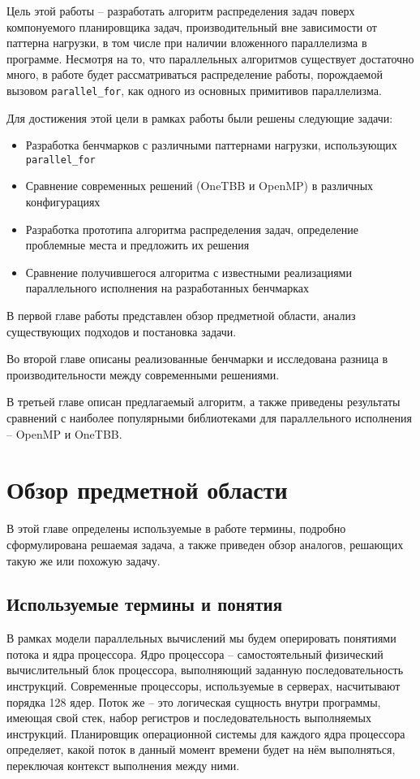 \documentclass[times,specification,annotation]{itmo-student-thesis}
\begin{document}
Цель этой работы -- разработать алгоритм распределения задач поверх компонуемого планировщика задач, производительный вне зависимости от паттерна нагрузки, в том числе при наличии вложенного параллелизма в программе. Несмотря на то, что параллельных алгоритмов существует достаточно много, в работе будет рассматриваться распределение работы, порождаемой вызовом \texttt{parallel\_for}, как одного из основных примитивов параллелизма.

Для достижения этой цели в рамках работы были решены следующие задачи:
\begin{itemize}
  \item Разработка бенчмарков с различными паттернами нагрузки, использующих \texttt{parallel\_for}
  \item Сравнение современных решений (OneTBB и OpenMP) в различных конфигурациях
  \item Разработка прототипа алгоритма распределения задач, определение проблемные места и предложить их решения
  \item Сравнение получившегося алгоритма с известными реализациями параллельного исполнения на разработанных бенчмарках
\end{itemize}

В первой главе работы представлен обзор предметной области, анализ существующих подходов и постановка задачи. 

Во второй главе описаны реализованные бенчмарки и исследована разница в производительности между современными решениями. 

В третьей главе описан предлагаемый алгоритм, а также приведены результаты сравнений с наиболее популярными библиотеками для параллельного исполнения -- OpenMP и OneTBB.  

\chapter{Обзор предметной области}
В этой главе определены используемые в работе термины, подробно сформулирована решаемая задача, а также приведен обзор аналогов, решающих такую же или похожую задачу.

\section{Используемые термины и понятия}

В рамках модели параллельных вычислений мы будем оперировать понятиями потока и ядра процессора. Ядро процессора -- самостоятельный физический вычислительный блок процессора, выполняющий заданную последовательность инструкций. Современные процессоры, используемые в серверах, насчитывают порядка 128 ядер.
Поток же -- это логическая сущность внутри программы, имеющая свой стек, набор регистров и последовательность выполняемых инструкций. Планировщик операционной системы для каждого ядра процессора определяет, какой поток в данный момент времени будет на нём выполняться, переключая контекст выполнения между ними. 
\end{document}
